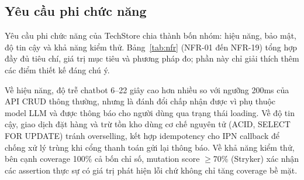 \subsection{Yêu cầu phi chức năng}

Yêu cầu phi chức năng của TechStore chia thành bốn nhóm: hiệu năng, bảo mật, độ tin cậy và khả năng kiểm thử. Bảng~\ref{tab:nfr} (NFR-01 đến NFR-19) tổng hợp đầy đủ tiêu chí, giá trị mục tiêu và phương pháp đo; phần này chỉ giải thích thêm các điểm thiết kế đáng chú ý.

Về hiệu năng, độ trễ chatbot 6--22 giây cao hơn nhiều so với ngưỡng 200ms của API CRUD thông thường, nhưng là đánh đổi chấp nhận được vì phụ thuộc model LLM và được thông báo cho người dùng qua trạng thái loading. Về độ tin cậy, giao dịch đặt hàng và trừ tồn kho dùng cơ chế nguyên tử (ACID, SELECT FOR UPDATE) tránh overselling, kết hợp idempotency cho IPN callback để chống xử lý trùng khi cổng thanh toán gửi lại thông báo. Về khả năng kiểm thử, bên cạnh coverage 100\% cả bốn chỉ số, mutation score $\geq$70\% (Stryker) xác nhận các assertion thực sự có giá trị phát hiện lỗi chứ không chỉ tăng coverage bề mặt.

